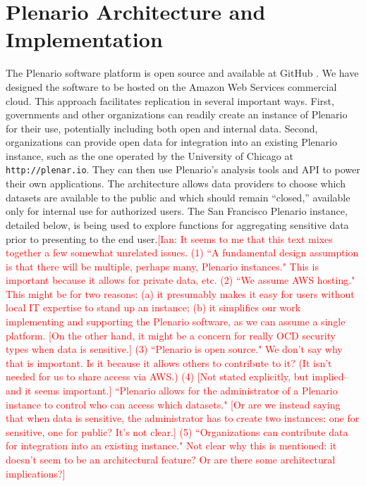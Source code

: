 \documentclass[11pt]{article}
\newcommand{\ian}[1]{\textcolor{Red}{[Ian: #1]}}
\newcommand{\ian}[1]{}
\begin{document}
\section{Plenario Architecture and Implementation}
The Plenario software platform is open source and available at GitHub \cite{plenario-github}. We have designed the software to be hosted on the Amazon Web Services commercial cloud. This approach facilitates replication in several important ways. First, governments and other organizations can readily create an instance of Plenario for their use, potentially including both open and internal data. Second, organizations can provide open data for integration into an existing Plenario instance, such as the one operated by the University of Chicago at {\tt http://plenar.io}. They can then use Plenario's analysis tools and API to power their own applications. The architecture allows data providers to choose which datasets are available to the public and which should remain ``closed,'' available only for internal use for authorized users. The San Francisco Plenario instance, detailed below, is being used to explore functions for aggregating sensitive data prior to presenting to the end user.\ian{It seems to me that this text mixes together a few somewhat unrelated issues. (1) ``A fundamental design assumption is that there will be multiple, perhaps many, Plenario instances." This is important because it allows for private data, etc. (2) ``We assume AWS hosting." This might be for two reasons: (a) it presumably makes it easy for users without local IT expertise to stand up an instance; (b) it simplifies our work implementing and supporting the Plenario software, as we can assume a single platform. [On the other hand, it might be a concern for really OCD security types when data is sensitive.] (3) ``Plenario is open source." We don't say why that is important. Is it because it allows others to contribute to it? (It isn't needed for us to share access via AWS.) (4) [Not stated explicitly, but implied--and it seems important.] ``Plenario allows for the administrator of a Plenario instance to control who can access which datasets." [Or are we instead saying that when data is sensitive, the administrator has to create two instances: one for sensitive, one for public? It's not clear.] (5) ``Organizations can contribute data for integration into an existing instance." Not clear why this is mentioned: it doesn't seem to be an architectural feature? Or are there some architectural implications?}
\end{document}
